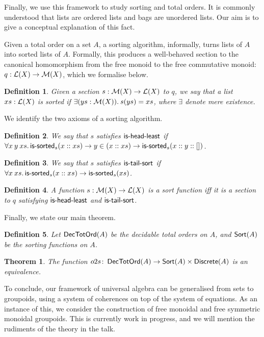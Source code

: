 \documentclass{article}
\newtheorem{definition}{Definition}
\newtheorem{theorem}{Theorem}
\begin{document}
Finally, we use this framework to study sorting and total orders. It is commonly understood that lists are ordered
lists and bags are unordered lists. Our aim is to give a conceptual explanation of this fact.

Given a total order on a set $A$, a sorting algorithm, informally, turns lists of $A$ into sorted lists of $A$.
%
Formally, this produces a well-behaved section to the canonical homomorphism from the free monoid to the free
commutative monoid: $q : \mathcal{L}(X) \to \mathcal{M}(X)$, which we formalise below.

\begin{definition}
    Given a section $s : \mathcal{M}(X) \to \mathcal{L}(X)$ to $q$,
    we say that a list $xs : \mathcal{L}(X)$ is sorted if $\exists (ys : \mathcal{M}(X)). \: s(ys) = xs$,
    where $\exists$ denote mere existence.
\end{definition}

\noindent
We identify the two axioms of a sorting algorithm.

\begin{definition}
    We say that $s$ satisfies $\operatorname{\mathsf{is-head-least}}$ if
    $\forall x \: y \: xs. \operatorname{\mathsf{is-sorted}}_{s}(x :: xs) \to y \in (x :: xs) \to \operatorname{\mathsf{is-sorted}}_{s}(x :: y :: [])$.
\end{definition}

\begin{definition}
    We say that $s$ satisfies $\operatorname{\mathsf{is-tail-sort}}$ if
    $\forall x \: xs. \operatorname{\mathsf{is-sorted}}_{s}(x :: xs) \to \operatorname{\mathsf{is-sorted}}_{s}(xs)$.
\end{definition}

\begin{definition}
    A function $s : \mathcal{M}(X) \to \mathcal{L}(X)$ is a sort function iff
    it is a section to $q$ 
    satisfying $\operatorname{\mathsf{is-head-least}}$ and $\operatorname{\mathsf{is-tail-sort}}$.
\end{definition}

\noindent
Finally, we state our main theorem.

\begin{definition}
    Let $\operatorname{\mathsf{DecTotOrd}}(A)$ be the decidable total orders on $A$,
    and $\operatorname{\mathsf{Sort}}(A)$ be the sorting functions on $A$.
\end{definition}

\begin{theorem}
    The function $o2s \colon \operatorname{\mathsf{DecTotOrd}}(A) \to \operatorname{\mathsf{Sort}}(A) \times \operatorname{\mathsf{Discrete}}(A)$
    is an equivalence.
\end{theorem}

\medskip\noindent
To conclude, our framework of universal algebra can be generalised from sets to groupoids, using a system of
coherences on top of the system of equations. As an instance of this, we consider the construction of free monoidal and
free symmetric monoidal groupoids. This is currently work in progress, and we will mention the rudiments of the theory
in the talk.

\printbibliography
\end{document}
